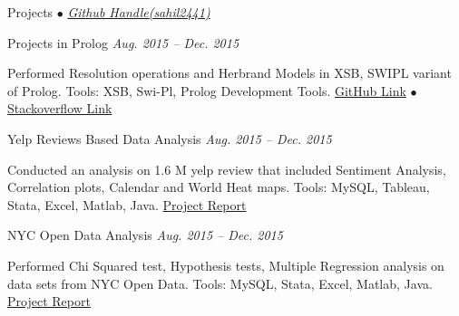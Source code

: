 \documentclass{resume} %
\begin{document}
\begin{rSection}{Projects {$\bullet$} \emph{\href{http://www.github.com/sahil2441}{\footnotesize Github Handle(sahil2441)}}}
\begin{rSubsection}{Projects in Prolog }{\emph{Aug. 2015 -- Dec. 2015}}{}{}
\item Performed Resolution operations and Herbrand Models in XSB, SWIPL variant of Prolog. Tools: XSB, Swi-Pl, Prolog Development Tools.
\href{https://github.com/sahil2441/Prolog-Problems}{GitHub Link}
{\tiny$\bullet$}
\href{http://stackoverflow.com/users/2733964/sahil-jain}{Stackoverflow Link}
\end{rSubsection}


\begin{rSubsection}{Yelp Reviews Based Data Analysis }{\emph{Aug. 2015 -- Dec. 2015}}{}{}
\item Conducted an analysis on 1.6 M yelp review that included Sentiment Analysis, Correlation plots, Calendar
      and World Heat maps.  Tools: MySQL, Tableau, Stata, Excel, Matlab, Java. 
\href{https://drive.google.com/file/d/0BzgUxxyAUxkycTZsY0pUUXY0NmM/view?usp=sharing}{Project Report}
\end{rSubsection}


\begin{rSubsection}{NYC Open Data Analysis  }{\emph{Aug. 2015 -- Dec. 2015} }{}{}
\item Performed Chi Squared test, Hypothesis tests, Multiple Regression analysis on data sets from NYC Open
      Data. Tools: MySQL, Stata, Excel, Matlab, Java.
     \href{https://drive.google.com/file/d/0BzgUxxyAUxkyZTRlVE9xZVR6NDg/view?usp=sharing}{Project Report}
\end{rSubsection}

\end{rSection}
\end{document}
